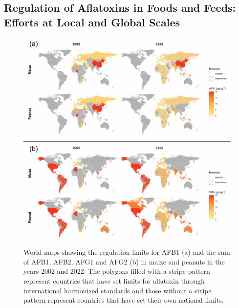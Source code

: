 \subsection{Regulation of Aflatoxins in Foods and Feeds: Efforts at Local and Global Scales} \label{subchap:globalregulation}

\begin{figure}[ht]
	\centering
	\includegraphics[width=1.15\textwidth,center]{figures/aflatoxin_regulation_limits.pdf}
	\decoRule
	\captionsetup{labelfont=bf, justification=justified, singlelinecheck=false, width=1.1\textwidth}
	\caption{World maps showing the regulation limits for AFB1 (a) and the sum of AFB1, AFB2, AFG1 and AFG2 (b) in maize and peanuts in the years 2002 and 2022. The polygons filled with a stripe pattern represent countries that have set limits for aflatoxin through international harmonized standards and those without a stripe pattern represent countries that have set their own national limits.}
	\label{fig:Aflatoxin_Regulation_Limits}
\end{figure} 
\afterpage{\FloatBarrier}

